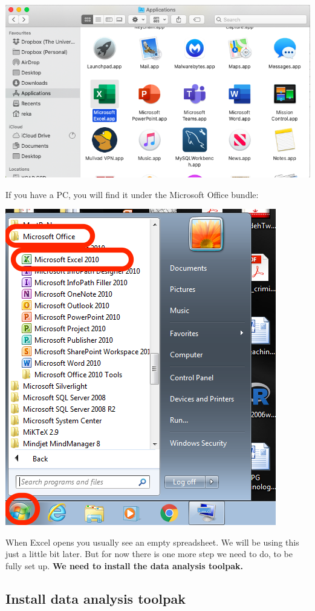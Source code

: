 \documentclass[
]{book}
\begin{document}
\includegraphics{imgs/finder_excel.png}

If you have a PC, you will find it under the Microsoft Office bundle:

\includegraphics{imgs/open_excel.png}

When Excel opens you usually see an empty spreadsheet. We will be using this just a little bit later. But for now there is one more step we need to do, to be fully set up. \textbf{We need to install the data analysis toolpak.}

\hypertarget{install-data-analysis-toolpak}{%
\subsection{Install data analysis toolpak}\label{install-data-analysis-toolpak}}
\end{document}
